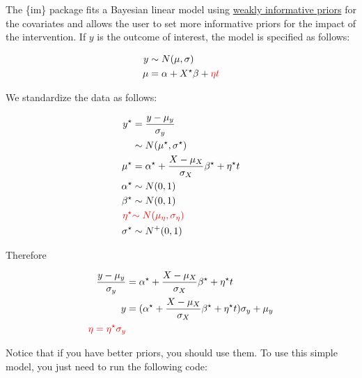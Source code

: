 \documentclass[
  letterpaper,
  DIV=11,
  numbers=noendperiod]{scrreprt}
\newenvironment{Shaded}{\begin{snugshade}}{\end{snugshade}}
\newcommand{\AttributeTok}[1]{\textcolor[rgb]{0.40,0.45,0.13}{#1}}
\newcommand{\DecValTok}[1]{\textcolor[rgb]{0.68,0.00,0.00}{#1}}
\newcommand{\FloatTok}[1]{\textcolor[rgb]{0.68,0.00,0.00}{#1}}
\newcommand{\FunctionTok}[1]{\textcolor[rgb]{0.28,0.35,0.67}{#1}}
\newcommand{\NormalTok}[1]{\textcolor[rgb]{0.00,0.23,0.31}{#1}}
\newcommand{\OtherTok}[1]{\textcolor[rgb]{0.00,0.23,0.31}{#1}}
\newcommand{\SpecialCharTok}[1]{\textcolor[rgb]{0.37,0.37,0.37}{#1}}
\newcommand{\StringTok}[1]{\textcolor[rgb]{0.13,0.47,0.30}{#1}}
\begin{document}
The \{im\} package fits a Bayesian linear model using
\href{https://github.com/stan-dev/stan/wiki/Prior-Choice-Recommendations}{weakly
informative priors} for the covariates and allows the user to set more
informative priors for the impact of the intervention. If \(y\) is the
outcome of interest, the model is specified as follows:

\[
\begin{aligned}
y & \sim N(\mu, \sigma) \\
\mu &= \alpha + X^\star\beta + \color{red}{\eta} t
\end{aligned}
\]

We standardize the data as follows:

\[
\begin{aligned}
y^\star & = \frac{y - \mu_y}{\sigma_y} \\
 & \sim N(\mu^\star, \sigma^\star) \\
\mu^\star & = \alpha^\star + \frac{X - \mu_X}{\sigma_X} \beta^\star +
 \eta^\star t \\
 \alpha^\star & \sim N(0,1) \\
 \beta^\star & \sim N(0,1) \\
 \color{red}{\eta^\star} & \color{red}{\sim N(\mu_\eta, \sigma_\eta)} \\
 \sigma^\star & \sim N^+(0,1) \\
\end{aligned}
\]

Therefore

\[
\begin{aligned}
\frac{y - \mu_y}{\sigma_y} & = \alpha^\star +
\frac{X - \mu_X}{\sigma_X} \beta^\star + \eta^\star t \\
y & = (\alpha^\star +
\frac{X - \mu_X}{\sigma_X} \beta^\star + \eta^\star t) \sigma_y + \mu_y \\
\color{red}\eta = \eta^\star \sigma_y
\end{aligned}
\]

Notice that if you have better priors, you should use them. To use this
simple model, you just need to run the following code:

\begin{Shaded}
\end{Shaded}
\end{document}
